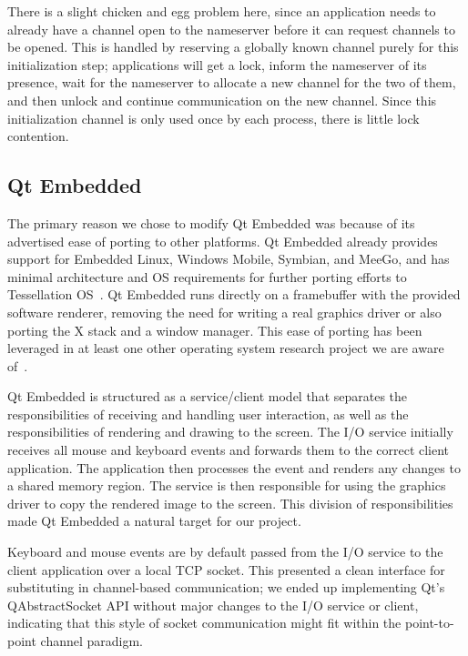 \documentclass[letterpaper,twocolumn,10pt]{article}
\begin{document}
There is a slight chicken and egg problem here, since an application needs to already have a channel open to the nameserver before it can request channels to be opened. This is handled by reserving a globally known channel purely for this initialization step; applications will get a lock, inform the nameserver of its presence, wait for the nameserver to allocate a new channel for the two of them, and then unlock and continue communication on the new channel. Since this initialization channel is only used once by each process, there is little lock contention.

\subsection{Qt Embedded}

The primary reason we chose to modify Qt Embedded was because of its advertised ease of porting to other platforms. Qt Embedded already provides support for Embedded Linux, Windows Mobile, Symbian, and MeeGo, and has minimal architecture and OS requirements for further porting efforts to Tessellation OS~\cite{qtembedded}.
 Qt Embedded runs directly on a framebuffer with the provided software renderer, removing the need for writing a real graphics driver or also porting the X stack and a window manager. This ease of porting has been leveraged in at least one other operating system research project we are aware of~\cite{ibos}. 

Qt Embedded is structured as a service/client model that separates the responsibilities of receiving and handling user interaction, as well as the responsibilities of rendering and drawing to the screen. The I/O service initially receives all mouse and keyboard events and forwards them to the correct client application. The application then processes the event and renders any changes to a shared memory region. The service is then responsible for using the graphics driver to copy the rendered image to the screen. This division of responsibilities made Qt Embedded a natural target for our project.

Keyboard and mouse events are by default passed from the I/O service to the client application over a local TCP socket. This presented a clean interface for substituting in channel-based communication; we ended up implementing Qt's QAbstractSocket API without major changes to the I/O service or client, indicating that this style of socket communication might fit within the point-to-point channel paradigm.
\end{document}
